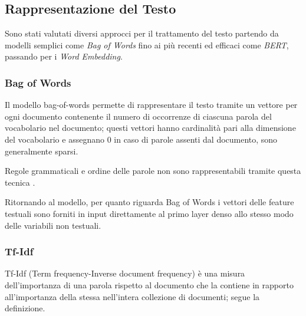 

\subsection{Rappresentazione del Testo}

Sono stati valutati diversi approcci per il trattamento del testo partendo da
modelli semplici come \textit{Bag of Words} fino ai più recenti ed efficaci come
\textit{BERT}, passando per i \textit{Word Embedding}.

\subsubsection{Bag of Words}
Il modello bag-of-words permette di rappresentare il testo tramite un vettore
per ogni documento contenente il numero di occorrenze di ciascuna parola del
vocabolario nel documento; questi vettori hanno cardinalità pari alla dimensione
del vocabolario e assegnano 0 in caso di parole assenti dal documento, sono
generalmente sparsi.

Regole grammaticali e ordine delle parole non sono rappresentabili
tramite questa tecnica \cite{manning_raghavan_schutze_2008}.

Ritornando al modello, per quanto riguarda Bag of Words i vettori delle feature
testuali sono forniti in input direttamente al primo layer denso allo stesso
modo delle variabili non testuali.

\subsubsection{Tf-Idf}\label{section-tfidf} Tf-Idf (Term frequency-Inverse
document frequency) \cite{manning_raghavan_schutze_2008} è una misura
dell'importanza di una parola rispetto al documento che la contiene in rapporto
all'importanza della stessa nell'intera collezione di documenti; segue la
definizione.%

